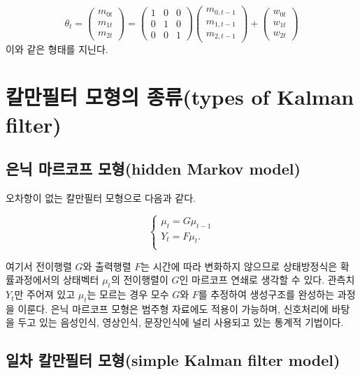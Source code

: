 \documentclass[b5paper,]{scrbook}
\theoremstyle{plain}
\theoremstyle{definition}
\numberwithin{equation}{section}
\begin{document}
\[
\theta_{t} =
 \begin{pmatrix}
  m_{0t} \\
  m_{1t} \\
  m_{2t} 
 \end{pmatrix}
= 
 \begin{pmatrix}
  1 & 0 & 0 \\
  0 & 1 & 0 \\
  0 & 0 & 1
 \end{pmatrix}
 \begin{pmatrix}
  m_{0,t-1} \\
  m_{1,t-1} \\
  m_{2,t-1} 
 \end{pmatrix} 
+
 \begin{pmatrix}
  w_{0t} \\
  w_{1t} \\
  w_{2t} 
 \end{pmatrix}
\] 이와 같은 형태를 지닌다.

\section{칼만필터 모형의 종류(types of Kalman
filter)}\label{--types-of-kalman-filter}

\subsection{은닉 마르코프 모형(hidden Markov
model)}\label{--hidden-markov-model}

오차항이 없는 칼만필터 모형으로 다음과 같다.

\[
\begin{cases}
\mu_{t}=G\mu_{t-1} \\
Y_{t}=F\mu_{t}.\\
\end{cases}
\]

여기서 전이행렬 \(G\)와 출력행렬 \(F\)는 시간에 따라 변화하지 않으므로
상태방정식은 확률과정에서의 상태벡터 \(\mu_{t}\)의 전이행렬이 \(G\)인
마르코프 연쇄로 생각할 수 있다. 관측치 \(Y_{t}\)만 주어져 있고
\(\mu_{t}\)는 모르는 경우 모수 \(G\)와 \(F\)를 추정하여 생성구조를
완성하는 과정을 이룬다. 은닉 마르코프 모형은 범주형 자료에도 적용이
가능하며, 신호처리에 바탕을 두고 있는 음성인식, 영상인식, 문장인식에
널리 사용되고 있는 통계적 기법이다.

\subsection{일차 칼만필터 모형(simple Kalman filter
model)}\label{--simple-kalman-filter-model}
\end{document}
